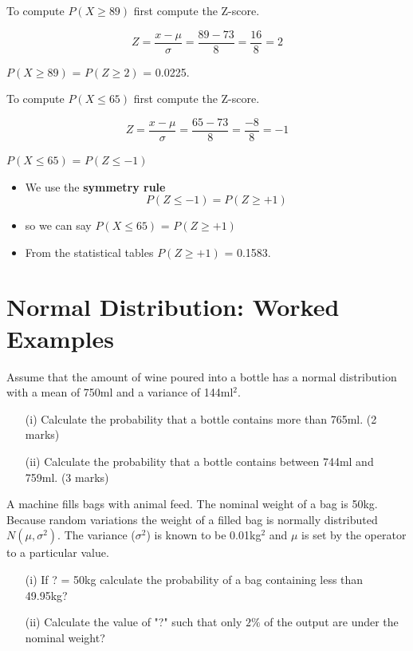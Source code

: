 \documentclass[]{report}
\begin{document}
To compute $P(X \geq 89)$ first compute the Z-score.

\[ Z = \frac{x - \mu}{\sigma} = \frac{89 - 73}{8} =\frac{16}{8} = 2 \]

$P(X \geq 89)$ = $P(Z \geq 2)$ = 0.0225.

To compute $P(X \leq 65)$ first compute the Z-score.

\[ Z = \frac{x - \mu}{\sigma} = \frac{65 - 73}{8} =\frac{-8}{8} = -1 \]

$P(X \leq 65)$ = $P(Z \leq -1)$ 

\begin{itemize}
\item We use the \textbf{symmetry rule}
\[ P(Z \leq -1) = P(Z \geq +1) \]
\item so we can say $P(X \leq 65)$ = $P(Z \geq +1)$ 
\item From the statistical tables $P(Z \geq +1)$ = 0.1583.
\end{itemize}







\section{Normal Distribution: Worked Examples}

Assume that the amount of wine poured into a bottle has a normal distribution with a mean of 750ml and a variance of 144ml$^2$.

\begin{itemize}

\item[(i)]  Calculate the probability that a bottle contains more than 765ml. (2 marks)
\item[(ii)]    Calculate the probability that a bottle contains between 744ml and 759ml. (3 marks)
\end{itemize}
A machine fills bags with animal feed. The nominal weight of a bag is 50kg.
Because random variations the weight of a filled bag is normally distributed
$N(\mu, \sigma^2)$. The variance ($\sigma^2$) is known to be 0.01kg$^2$ and $\mu$ is set by the
operator to a particular value.

\begin{itemize}
\item[(i)] If ? = 50kg calculate the probability of a bag containing less than
49.95kg?
\item[(ii)] Calculate the value of "?" such that only $2\%$ of the output are under the
nominal weight?
\end{itemize}
\end{document}
